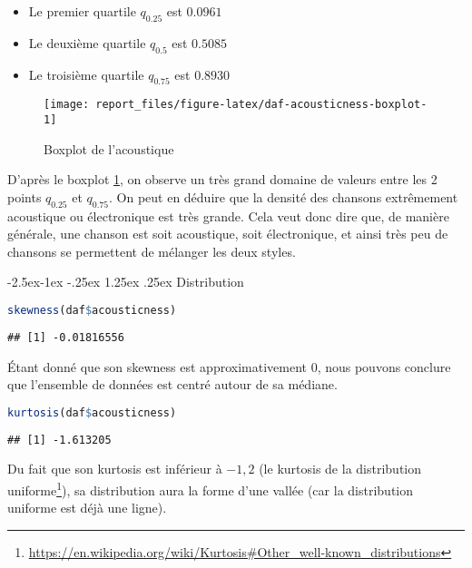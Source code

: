 \documentclass[
  11pt,
  xcolor = usenames,dvipsnames]{article}
\makeatletter
\providecommand{\tightlist}{%
  \setlength{\itemsep}{0pt}\setlength{\parskip}{0pt}}
\renewcommand\paragraph{\@startsection{paragraph}{4}{\z@}%
        {-2.5ex\@plus -1ex \@minus -.25ex}%
        {1.25ex \@plus .25ex}%
        {\normalfont\normalsize\bfseries}}
\makeatother
\begin{document}
\begin{itemize}
\tightlist
\item
  Le premier quartile \(q_{0.25}\) est \(0.0961\)
\item
  Le deuxième quartile \(q_{0.5}\) est \(0.5085\)
\item
  Le troisième quartile \(q_{0.75}\) est \(0.8930\)
\end{itemize}

\begin{figure}

{\centering \texttt{[image: report\_files/figure-latex/daf-acousticness-boxplot-1]} 

}

\caption{Boxplot de l'acoustique}\label{fig:daf-acousticness-boxplot}
\end{figure}

D'après le boxplot \ref{fig:daf-acousticness-boxplot}, on observe un très grand domaine de valeurs entre les 2 points \(q_{0.25}\) et \(q_{0.75}\).
On peut en déduire que la densité des chansons extrêmement acoustique ou électronique est très grande.
Cela veut donc dire que, de manière générale, une chanson est soit acoustique, soit électronique, et ainsi très peu de chansons se permettent de mélanger les deux styles.

\hypertarget{distribution}{%
\paragraph{Distribution}\label{distribution}}

\begin{lstlisting}[language=R]
skewness(daf$acousticness)
\end{lstlisting}

\begin{lstlisting}
## [1] -0.01816556
\end{lstlisting}

Étant donné que son skewness est approximativement 0, nous pouvons conclure que
l'ensemble de données est centré autour de sa médiane.

\begin{lstlisting}[language=R]
kurtosis(daf$acousticness)
\end{lstlisting}

\begin{lstlisting}
## [1] -1.613205
\end{lstlisting}

Du fait que son kurtosis est inférieur à \(-1,2\) (le kurtosis de la distribution uniforme\footnote{\url{https://en.wikipedia.org/wiki/Kurtosis\#Other_well-known_distributions}}),
sa distribution aura la forme d'une vallée (car la distribution uniforme est déjà une ligne).
\end{document}
